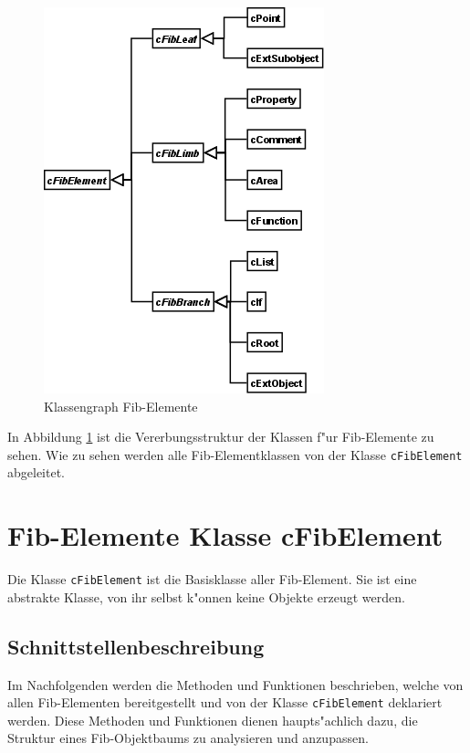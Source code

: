 \begin{figure}[htbp]
\begin{center}
  \includegraphics[scale=0.4]{fib_elemente}
\end{center}
\caption{Klassengraph Fib-Elemente}
\label{figClassFibElements}
\end{figure}

In Abbildung \ref{figClassFibElements} ist die Vererbungsstruktur der Klassen f"ur Fib-Elemente zu sehen. Wie zu sehen werden alle Fib-Elementklassen von der Klasse \verb|cFibElement| abgeleitet.


\section{Fib-Elemente Klasse cFibElement}

Die Klasse \verb|cFibElement| ist die Basisklasse aller Fib-Element. Sie ist eine abstrakte Klasse, von ihr selbst k"onnen keine Objekte erzeugt werden.

\subsection{Schnittstellenbeschreibung}

Im Nachfolgenden werden die Methoden und Funktionen beschrieben, welche von allen Fib-Elementen bereitgestellt und von der Klasse \verb|cFibElement| deklariert werden. Diese Methoden und Funktionen dienen haupts"achlich dazu, die Struktur eines Fib-Objektbaums zu analysieren und anzupassen.

